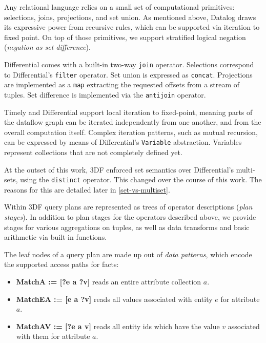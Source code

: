 \documentclass[../index.tex]{subfiles}
\begin{document}
Any relational language relies on a small set of computational
primitives: selections, joins, projections, and set union. As
mentioned above, Datalog draws its expressive power from recursive
rules, which can be supported via iteration to fixed point. On top of
those primitives, we support stratified logical negation
(\emph{negation as set difference}).

Differential comes with a built-in two-way \texttt{join}
operator. Selections correspond to Differential's \texttt{filter}
operator. Set union is expressed as \texttt{concat}. Projections are
implemented as a \texttt{map} extracting the requested offsets from a
stream of tuples. Set difference is implemented via the
\texttt{antijoin} operator.

Timely and Differential support local iteration to fixed-point,
meaning parts of the dataflow graph can be iterated independently from
one another, and from the overall computation itself. Complex
iteration patterns, such as mutual recursion, can be expressed by
means of Differential's \texttt{Variable} abstraction. Variables
represent collections that are not completely defined yet.

At the outset of this work, 3DF enforced set semantics over
Differential's multi-sets, using the \texttt{distinct} operator. This
changed over the course of this work. The reasons for this are
detailed later in \autoref{set-vs-multiset}.

Within 3DF query plans are represented as trees of operator
descriptions (\emph{plan stages}). In addition to plan stages for the
operators described above, we provide stages for various aggregations
on tuples, as well as data transforms and basic arithmetic via
built-in functions.

The leaf nodes of a query plan are made up out of \emph{data
  patterns}, which encode the supported access paths for facts:

\begin{itemize}
\item \textbf{MatchA := [?e a ?v]} reads an entire attribute
  collection $a$.
\item \textbf{MatchEA := [e a ?v]} reads all values associated with
  entity $e$ for attribute $a$.
\item \textbf{MatchAV := [?e a v]} reads all entity ids which have the
  value $v$ associated with them for attribute $a$.
\end{itemize}
\end{document}
